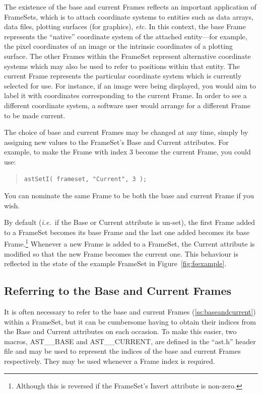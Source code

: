 \documentclass[twoside,11pt]{article}
\newcommand{\htmlref}[2]{#1}
\newcommand{\secref}[1]{\S\ref{#1}}
\renewcommand{\secref}[1]{\ref{#1}}
\begin{document}
The existence of the base and current Frames reflects an important
application of FrameSets, which is to attach coordinate systems to
entities such as data arrays, data files, plotting surfaces (for
graphics), {\em{etc.}}  In this context, the base Frame represents the
``native'' coordinate system of the attached entity---for example, the
pixel coordinates of an image or the intrinsic coordinates of a
plotting surface. The other Frames within the FrameSet represent
alternative coordinate systems which may also be used to refer to
positions within that entity.  The current Frame represents the
particular coordinate system which is currently selected for use. For
instance, if an image were being displayed, you would aim to label it
with coordinates corresponding to the current Frame. In order to see a
different coordinate system, a software user would arrange for a
different Frame to be made current.

The choice of base and current Frames may be changed at any time,
simply by assigning new values to the FrameSet's Base and Current
attributes. For example, to make the Frame with index 3 become the
current Frame, you could use:

\begin{quote}
\small
\begin{verbatim}
astSetI( frameset, "Current", 3 );
\end{verbatim}
\normalsize
\end{quote}

You can nominate the same Frame to be both the base and current Frame
if you wish.
\label{ss:baseandcurrentdefault}

By default ({\em{i.e.}}\ if the Base or Current attribute is un-set),
the first Frame added to a FrameSet becomes its base Frame and the
last one added becomes its base Frame.\footnote{Although this is
reversed if the FrameSet's \htmlref{Invert}{Invert} attribute is non-zero.} Whenever a
new Frame is added to a FrameSet, the Current attribute is modified so
that the new Frame becomes the current one. This behaviour is
reflected in the state of the example FrameSet in
Figure~\ref{fig:fsexample}.

\subsection{\label{ss:astbaseandastcurrent}Referring to the Base and Current Frames}

It is often necessary to refer to the base and current Frames
(\secref{ss:baseandcurrent}) within a \htmlref{FrameSet}{FrameSet}, but it can be
cumbersome having to obtain their indices from the \htmlref{Base}{Base} and \htmlref{Current}{Current}
attributes on each occasion. To make this easier, two macros,
AST\_\_BASE and AST\_\_CURRENT, are defined in the ``ast.h'' header
file and may be used to represent the indices of the base and current
Frames respectively. They may be used whenever a \htmlref{Frame}{Frame} index is
required.
\end{document}
